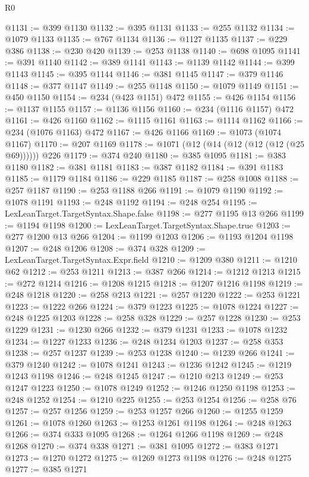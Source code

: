 \begin{lexlean}{R0}
\begin{coremodule}
@1131 := @399 @1130
@1132 := @395 @1131
@1133 := @255 @1132
@1134 := @1079 @1133
@1135 := @767 @1134
@1136 := @1127 @1135
@1137 := @229 @386
@1138 := @230 @420
@1139 := @253 @1138
@1140 := @698 @1095
@1141 := @391 @1140
@1142 := @389 @1141
@1143 := @1139 @1142
@1144 := @399 @1143
@1145 := @395 @1144
@1146 := @381 @1145
@1147 := @379 @1146
@1148 := @377 @1147
@1149 := @255 @1148
@1150 := @1079 @1149
@1151 := @450 @1150
@1154 := @234 (@423 @1151) @472
@1155 := @426 @1154
@1156 := @1137 @1155
@1157 := @1136 @1156
@1160 := @234 (@1116 @1157) @472
@1161 := @426 @1160
@1162 := @1115 @1161
@1163 := @1114 @1162
@1166 := @234 (@1076 @1163) @472
@1167 := @426 @1166
@1169 := @1073 (@1074 @1167)
@1170 := @207 @1169
@1178 := @1071 (@12 (@14 (@12 (@12 (@12 (@25 @69)))))) @226
@1179 := @374 @240
@1180 := @385 @1095
@1181 := @383 @1180
@1182 := @381 @1181
@1183 := @387 @1182
@1184 := @391 @1183
@1185 := @1179 @1184
@1186 := @229 @1185
@1187 := @258 @1008
@1188 := @257 @1187
@1190 := @253 @1188 @266
@1191 := @1079 @1190
@1192 := @1078 @1191
@1193 := @248 @1192
@1194 := @248 @254
@1195 := LexLeanTarget.TargetSyntax.Shape.false
@1198 := @277 @1195 @13 @266
@1199 := @1194 @1198
@1200 := LexLeanTarget.TargetSyntax.Shape.true
@1203 := @277 @1200 @13 @266
@1204 := @1199 @1203
@1206 := @1193 @1204 @1198
@1207 := @248 @1206
@1208 := @374 @328
@1209 := LexLeanTarget.TargetSyntax.Expr.field
@1210 := @1209 @380
@1211 := @1210 @62
@1212 := @253 @1211
@1213 := @387 @266
@1214 := @1212 @1213
@1215 := @272 @1214
@1216 := @1208 @1215
@1218 := @1207 @1216 @1198
@1219 := @248 @1218
@1220 := @258 @213
@1221 := @257 @1220
@1222 := @253 @1221
@1223 := @1222 @266
@1224 := @379 @1223
@1225 := @1078 @1224
@1227 := @248 @1225 @1203
@1228 := @258 @328
@1229 := @257 @1228
@1230 := @253 @1229
@1231 := @1230 @266
@1232 := @379 @1231
@1233 := @1078 @1232
@1234 := @1227 @1233
@1236 := @248 @1234 @1203
@1237 := @258 @353
@1238 := @257 @1237
@1239 := @253 @1238
@1240 := @1239 @266
@1241 := @379 @1240
@1242 := @1078 @1241
@1243 := @1236 @1242
@1245 := @1219 @1243 @1198
@1246 := @248 @1245
@1247 := @1210 @213
@1249 := @253 @1247 @1223
@1250 := @1078 @1249
@1252 := @1246 @1250 @1198
@1253 := @248 @1252
@1254 := @1210 @225
@1255 := @253 @1254
@1256 := @258 @76
@1257 := @257 @1256
@1259 := @253 @1257 @266
@1260 := @1255 @1259
@1261 := @1078 @1260
@1263 := @1253 @1261 @1198
@1264 := @248 @1263
@1266 := @374 @333 @1095
@1268 := @1264 @1266 @1198
@1269 := @248 @1268
@1270 := @374 @338
@1271 := @381 @1095
@1272 := @383 @1271
@1273 := @1270 @1272
@1275 := @1269 @1273 @1198
@1276 := @248 @1275
@1277 := @385 @1271

\end{coremodule}
\end{lexlean}
